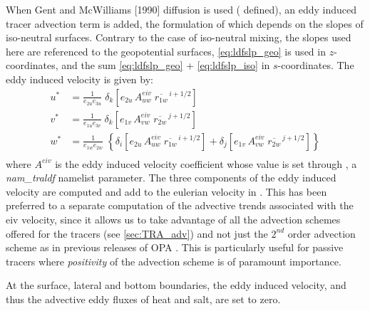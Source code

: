 \documentclass[../main/NEMO_manual]{subfiles}
\begin{document}
When Gent and McWilliams [1990] diffusion is used ( defined),
an eddy induced tracer advection term is added,
the formulation of which depends on the slopes of iso-neutral surfaces.
Contrary to the case of iso-neutral mixing, the slopes used here are referenced to the geopotential surfaces,
\ie \autoref{eq:ldfslp_geo} is used in $z$-coordinates,
and the sum \autoref{eq:ldfslp_geo} + \autoref{eq:ldfslp_iso} in $s$-coordinates.
The eddy induced velocity is given by: 
\begin{equation}
  \label{eq:ldfeiv}
  \begin{split}
    u^* & = \frac{1}{e_{2u}e_{3u}}\; \delta_k \left[e_{2u} \, A_{uw}^{eiv} \; \overline{r_{1w}}^{\,i+1/2} \right]\\
    v^* & = \frac{1}{e_{1u}e_{3v}}\; \delta_k \left[e_{1v} \, A_{vw}^{eiv} \; \overline{r_{2w}}^{\,j+1/2} \right]\\
    w^* & = \frac{1}{e_{1w}e_{2w}}\; \left\{ \delta_i \left[e_{2u} \, A_{uw}^{eiv} \; \overline{r_{1w}}^{\,i+1/2} \right] + \delta_j \left[e_{1v} \, A_{vw}^{eiv} \; \overline{r_{2w}}^{\,j+1/2} \right] \right\} \\
  \end{split}
\end{equation}
where $A^{eiv}$ is the eddy induced velocity coefficient whose value is set through ,
a \textit{nam\_traldf} namelist parameter.
The three components of the eddy induced velocity are computed and
add to the eulerian velocity in .
This has been preferred to a separate computation of the advective trends associated with the eiv velocity,
since it allows us to take advantage of all the advection schemes offered for the tracers
(see \autoref{sec:TRA_adv}) and not just the $2^{nd}$ order advection scheme as in
previous releases of OPA \citep{Madec1998}.
This is particularly useful for passive tracers where \emph{positivity} of the advection scheme is of
paramount importance. 

At the surface, lateral and bottom boundaries, the eddy induced velocity,
and thus the advective eddy fluxes of heat and salt, are set to zero. 

\biblio

\pindex
\end{document}
